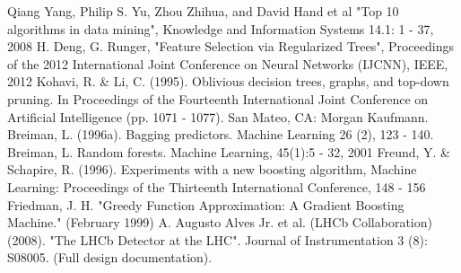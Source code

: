 \documentclass[twoside]{article}
\begin{document}
\begin{multicols}{2}


\begin{thebibliography}{99} %

Qiang Yang, Philip S. Yu, Zhou Zhihua, and David Hand et al "Top 10 algorithms in data mining", Knowledge and Information Systems 14.1: 1 - 37, 2008
H. Deng, G. Runger, "Feature Selection via Regularized Trees", Proceedings of the 2012 International Joint Conference on Neural Networks (IJCNN), IEEE, 2012
Kohavi, R. \& Li, C. (1995). Oblivious decision trees, graphs, and top-down pruning. In Proceedings of the Fourteenth International Joint Conference on Artificial Intelligence (pp. 1071 - 1077). San Mateo, CA: Morgan Kaufmann.
Breiman, L. (1996a). Bagging predictors. Machine Learning 26 (2), 123 - 140.
Breiman, L. Random forests. Machine Learning, 45(1):5 - 32, 2001
Freund, Y. \& Schapire, R. (1996). Experiments with a new boosting algorithm, Machine Learning: Proceedings of the Thirteenth International Conference, 148 - 156
Friedman, J. H. "Greedy Function Approximation: A Gradient Boosting Machine." (February 1999)
A. Augusto Alves Jr. et al. (LHCb Collaboration) (2008). "The LHCb Detector at the LHC". Journal of Instrumentation 3 (8): S08005. (Full design documentation).

 
\end{thebibliography}


\end{multicols}
\end{document}
